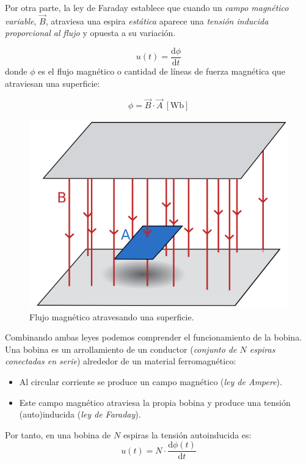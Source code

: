 Por otra parte, la ley de Faraday establece que cuando un \emph{campo magnético variable}, $\vec{B}$, atraviesa una espira \emph{estática} aparece una \emph{tensión inducida} \emph{proporcional al flujo} y opuesta a su variación.

\[
u(t) = \frac{\mathrm{d}\phi}{\mathrm{d}t} 
\]
donde $\phi$ es el flujo magnético o cantidad de líneas de fuerza magnética que atraviesan una superficie:

\[
\phi = \vec{B} \cdot \vec{A} \ [\mathrm{Wb}]
\]

\begin{figure}
  \centering
  \includegraphics[height=0.2\textheight]{../figs/flujo_magnetico.pdf}
  \caption{Flujo magnético atravesando una superficie.}
  \label{fig:flujo-magnetico}
\end{figure}

Combinando ambas leyes podemos comprender el funcionamiento de la bobina. Una bobina es un arrollamiento de un conductor (\emph{conjunto de $N$ espiras conectadas en serie}) alrededor de un material ferromagnético:
\begin{itemize}
\item Al circular corriente se produce un campo magnético (\emph{ley de Ampere}).
\item Este campo magnético atraviesa la propia bobina y produce una tensión (auto)inducida (\emph{ley de Faraday}).
\end{itemize}

Por tanto, en una bobina de $N$ espiras la tensión autoinducida es:
\[
u(t) = N \cdot \frac{\mathrm{d}\phi(t)}{\mathrm{d} t}
\]

